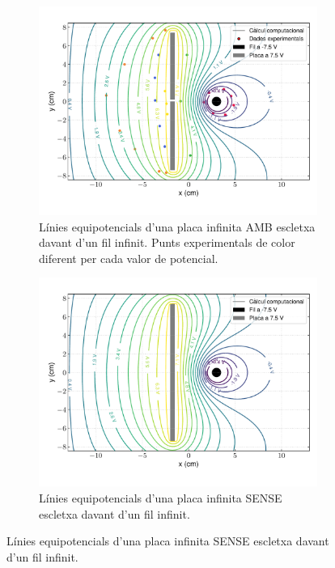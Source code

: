 \documentclass[11pt]{article}
\numberwithin{equation}{section}
\numberwithin{figure}{section}
\numberwithin{table}{section}
\begin{document}
\begin{figure}[h]
    \centering
    \begin{subfigure}{0.495\textwidth}
        \centering
        \includegraphics[width=\textwidth]{lliure_combi_e_colors.pdf}
        \caption{Línies equipotencials d'una placa infinita AMB escletxa davant d'un fil infinit. Punts experimentals de color diferent per cada valor de potencial.}
        \label{fig: lliure_pot_e}
    \end{subfigure}
    \begin{subfigure}{0.495\textwidth} 
        \centering
        \includegraphics[width=\textwidth]{lliure_combi_0.pdf}
        \caption{Línies equipotencials d'una placa infinita SENSE escletxa davant d'un fil infinit.}
        \label{fig: lliure_pot_0}
    \end{subfigure}
\end{figure}
\end{document}
